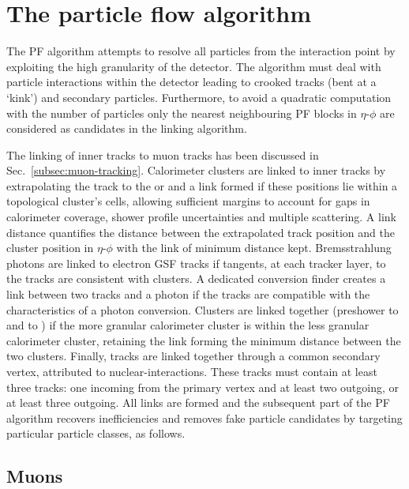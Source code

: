 \section{The particle flow algorithm}

The PF algorithm attempts to resolve all particles from the interaction point by exploiting the high granularity of the \CMS detector. The algorithm must deal with particle interactions within the detector leading to crooked tracks (bent at a `kink') and secondary particles. Furthermore, to avoid a quadratic computation with the number of particles only the nearest neighbouring PF blocks in $\eta$-$\phi$ are considered as candidates in the linking algorithm.

The linking of inner tracks to muon tracks has been discussed in {Sec.~\ref{subsec:muon-tracking}}. Calorimeter clusters are linked to inner tracks by extrapolating the track to the \ECAL or \HCAL and a link formed if these positions lie within a topological cluster's cells, allowing sufficient margins to account for gaps in calorimeter coverage, shower profile uncertainties and multiple scattering. A link distance quantifies the distance between the extrapolated track position and the cluster position in $\eta$-$\phi$ with the link of minimum distance kept. Bremsstrahlung photons are linked to electron GSF tracks if tangents, at each tracker layer, to the tracks are consistent with \ECAL clusters. A dedicated conversion finder creates a link between two tracks and a photon if the tracks are compatible with the characteristics of a photon conversion. Clusters are linked together (preshower to \ECAL and \ECAL to \HCAL) if the more granular calorimeter cluster is within the less granular calorimeter cluster, retaining the link forming the minimum distance between the two clusters. Finally, tracks are linked together through a common secondary vertex, attributed to nuclear-interactions. These tracks must contain at least three tracks: one incoming from the primary vertex and at least two outgoing, or at least three outgoing. All links are formed and the subsequent part of the PF algorithm recovers inefficiencies and removes fake particle candidates by targeting particular particle classes, as follows.


\subsection{Muons}

